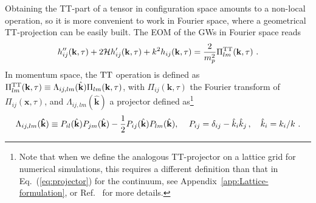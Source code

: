 \documentclass[a4paper,11pt]{article}
\newcommand{\bk}{{\mathbf k}}
\begin{document}
Obtaining the TT-part of a tensor in configuration space amounts to a non-local operation, so it is more convenient to work in Fourier space, where a geometrical TT-projection can be easily built. The EOM of the GWs in Fourier space reads
\begin{eqnarray}\label{eq:GWeq}
{h}_{ij}''(\bk,\tau)+2\mathcal{H}{h}'_{ij}(\mathbf{k},\tau) + k^2 h_{ij}(\mathbf{k},\tau) = {2\over m_p^2} \Pi_{lm}^{\rm TT } (\mathbf{k},\tau)\ .
\end{eqnarray}
In momentum space, the ${\rm TT}$ operation is defined as $\Pi_{lm}^{\rm TT}(\mathbf{k},\tau) \equiv \Lambda_{ij,lm}(\hat\bk)\Pi_{lm}(\mathbf{k},\tau)$, with $\Pi_{ij}(\mathbf{k},\tau)$ the Fourier transform of $\Pi_{ij}(\mathbf{x},\tau)$, and $\Lambda_{ij,lm}(\hat\bk)$ a projector defined as\footnote{Note that when we define the analogous TT-projector on a lattice grid for numerical simulations, this requires a different definition than that in Eq.~(\ref{eq:projector}) for the continuum, see Appendix~\ref{app:Lattice-formulation}, or Ref.~\cite{Figueroa:2011ye} for more details.}
\begin{eqnarray}\label{eq:projector}
\Lambda_{ij,lm}(\mathbf{\hat k}) \equiv P_{il}(\hat\bk)
P_{jm}(\hat\bk) - {1\over2} P_{ij}(\hat\bk)
P_{lm}(\hat\bk),\,~~~P_{ij} = \delta_{ij} - \hat k_i \hat k_j\,,~~~ \hat k_i = k_i/k \ .
\end{eqnarray}
\end{document}
